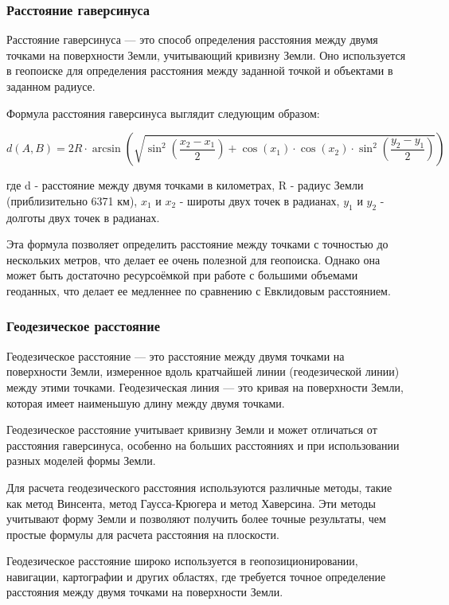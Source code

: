 \subsubsection{Расстояние гаверсинуса}
Расстояние гаверсинуса — это способ определения расстояния между двумя точками на поверхности Земли, учитывающий кривизну Земли. Оно используется в геопоиске для определения расстояния между заданной точкой и объектами в заданном радиусе.

Формула расстояния гаверсинуса выглядит следующим образом:

$$
d(A, B) = 2R \cdot \arcsin\left(\sqrt{\sin^2\left(\frac{x_2-x_1}{2}\right) + \cos(x_1) \cdot \cos(x_2) \cdot \sin^2\left(\frac{y_2-y_1}{2}\right)}\right)
$$

где d - расстояние между двумя точками в километрах, R - радиус Земли (приблизительно 6371 км), $x_1$ и $x_2$ - широты двух точек в радианах, $y_1$ и $y_2$ - долготы двух точек в радианах.

Эта формула позволяет определить расстояние между точками с точностью до нескольких метров, что делает ее очень полезной для геопоиска. Однако она может быть достаточно ресурсоёмкой при работе с большими объемами геоданных, что делает ее медленнее по сравнению с Евклидовым расстоянием.

\subsubsection{Геодезическое расстояние}
Геодезическое расстояние — это расстояние между двумя точками на поверхности Земли, измеренное вдоль кратчайшей линии (геодезической линии) между этими точками. Геодезическая линия — это кривая на поверхности Земли, которая имеет наименьшую длину между двумя точками.

Геодезическое расстояние учитывает кривизну Земли и может отличаться от расстояния гаверсинуса, особенно на больших расстояниях и при использовании разных моделей формы Земли.

Для расчета геодезического расстояния используются различные методы, такие как метод Винсента, метод Гаусса-Крюгера и метод Хаверсина. Эти методы учитывают форму Земли и позволяют получить более точные результаты, чем простые формулы для расчета расстояния на плоскости.

Геодезическое расстояние широко используется в геопозиционировании, навигации, картографии и других областях, где требуется точное определение расстояния между двумя точками на поверхности Земли.

